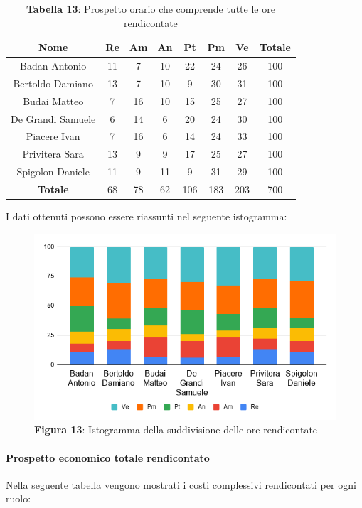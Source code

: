 \begin{table}[H]
	\centering
	\renewcommand{\arraystretch}{1.5}
	\begin{tabular}{|c|c|c|c|c|c|c|c|}
		\hline
		\rowcolor{lighter-grayer}
Nome & Re & Am & An & Pt & Pm & Ve & Totale \\ \hline
Badan Antonio & 11 & 7 & 10 & 22 & 24 & 26 & 100 \\ \hline
Bertoldo Damiano & 13 & 7 & 10 & 9 & 30 & 31 & 100 \\ \hline
Budai Matteo & 7 & 16 & 10 & 15 & 25 & 27 & 100 \\ \hline
De Grandi Samuele & 6 & 14 & 6 & 20 & 24 & 30 & 100 \\ \hline
Piacere Ivan & 7 & 16 & 6 & 14 & 24 & 33 & 100 \\ \hline
Privitera Sara & 13 & 9 & 9 & 17 & 25 & 27 & 100 \\ \hline
Spigolon Daniele & 11 & 9 & 11 & 9 & 31 & 29 & 100 \\ \hline
\textbf{Totale} & 68 & 78 & 62 & 106 & 183 & 203 & 700 \\ \hline
	\end{tabular}
	\caption*{\textbf{Tabella 13}: Prospetto orario che comprende tutte le ore rendicontate\\}
\end{table}	
I dati ottenuti possono essere riassunti nel seguente istogramma:

\begin{figure}[H]
	\centering
	\includegraphics[width=0.7\linewidth]{res/images/IstogrammaTotaleRendicontato.png}
	\caption*{\textbf{Figura 13}: Istogramma della suddivisione delle ore rendicontate}
	\label{fig:Figura10}
\end{figure}

\paragraph{Prospetto economico totale rendicontato}
Nella seguente tabella vengono mostrati i costi complessivi rendicontati per ogni ruolo:

